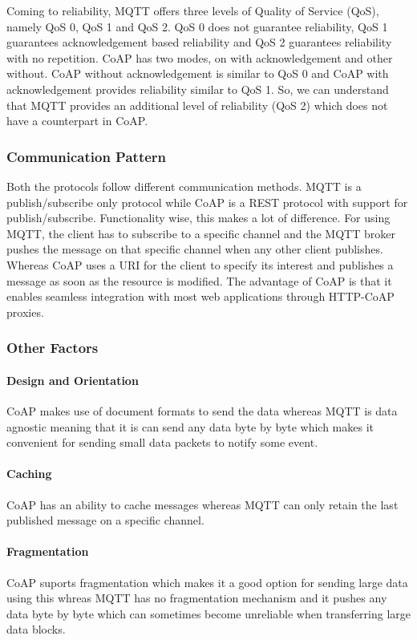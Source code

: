 \documentclass[conference]{IEEEtran}
\begin{document}
Coming to reliability, MQTT offers three levels of Quality of Service (QoS), namely QoS 0, QoS 1 and QoS 2. QoS 0 does not guarantee reliability, QoS 1 guarantees acknowledgement based reliability and QoS 2 guarantees reliability with no repetition. CoAP has two modes, on with acknowledgement and other without. CoAP without acknowledgement is similar to QoS 0 and CoAP with acknowledgement provides reliability similar to QoS 1. So, we can understand that MQTT provides an additional level of reliability (QoS 2) which does not have a counterpart in CoAP.

\subsubsection{Communication Pattern}
Both the protocols follow different communication methods. MQTT is a publish/subscribe only protocol while CoAP is a REST protocol with support for publish/subscribe. Functionality wise, this makes a lot of difference. For using MQTT, the client has to subscribe to a specific channel and the MQTT broker pushes the message on that specific channel when any other client publishes. Whereas CoAP uses a URI for the client to specify its interest and publishes a message as soon as the resource is modified. The advantage of CoAP is that it enables seamless integration with most web applications through HTTP-CoAP proxies.

\subsubsection{Other Factors}
\paragraph{Design and Orientation}
CoAP makes use of document formats to send the data whereas MQTT is data agnostic meaning that it is can send any data byte by byte which makes it convenient for sending small data packets to notify some event.

\paragraph{Caching}
CoAP has an ability to cache messages whereas MQTT can only retain the last published message on a specific channel.

\paragraph{Fragmentation}
CoAP suports fragmentation which makes it a good option for sending large data using this whreas MQTT has no fragmentation mechanism and it pushes any data byte by byte which can sometimes become unreliable when transferring large data blocks.
\end{document}
